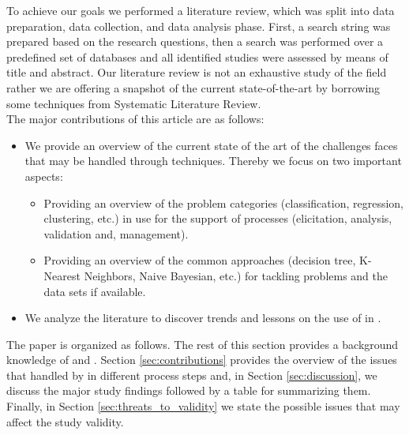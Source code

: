 To achieve our goals we performed a literature review, which was split into data preparation, data collection, and data analysis phase. First, a search string was prepared based on the research questions, then a search was performed over a predefined set of databases and all identified studies were assessed by means of title and abstract. Our literature review is not an exhaustive study of the field rather we are offering a snapshot of the current state-of-the-art by borrowing some techniques from Systematic Literature Review.\\
The major contributions of this article are as follows:
\begin{itemize}
    \item We provide an overview of the current state of the art of the challenges \RE faces that may be handled through \ML techniques. Thereby we focus on two important aspects:
    \begin{itemize}
        \item Providing an overview of the \ML problem categories (classification, regression, clustering, etc.) in use for the support of \RE processes (elicitation, analysis, validation and, management).
        \item Providing an overview of the common \ML approaches (decision tree, K-Nearest Neighbors, Naive Bayesian, etc.) for tackling \RE problems and the data sets if available. 
    \end{itemize}
    \item We analyze the literature to discover trends and lessons on the use of \ML in \RE.
\end{itemize}
The paper is organized as follows. The rest of this section provides a background knowledge of \ML and \RE. Section \ref{sec:contributions} provides the overview of the issues that handled by \ML in different \RE process steps and, in Section \ref{sec:discussion}, we discuss the major study findings followed by a table for summarizing them. Finally, in Section \ref{sec:threats_to_validity} we state the possible issues that may affect the study validity.


